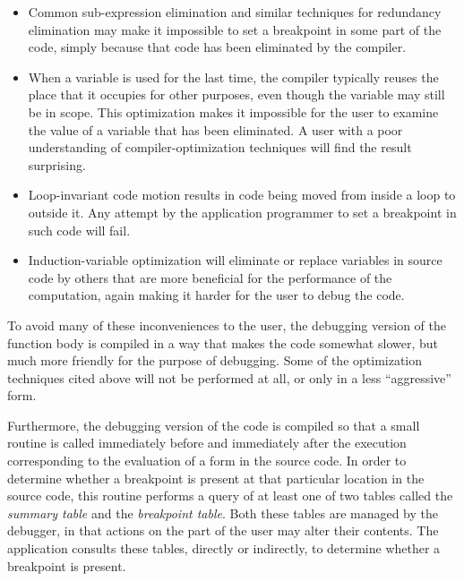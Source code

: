 \begin{itemize}
\item Common sub-expression elimination and similar techniques for
  redundancy elimination may make it impossible to set
  a breakpoint in some part of the code, simply because that code has
  been eliminated by the compiler.
\item When a variable is used for the last time, the compiler
  typically reuses the place that it occupies for other purposes, even
  though the variable may still be in scope.  This optimization makes
  it impossible for the user to examine the value of
  a variable that has been eliminated.  A user with
  a poor understanding of compiler-optimization techniques will find
  the result surprising.
\item Loop-invariant code motion results in code being moved from
  inside a loop to outside it.  Any attempt by the application
  programmer to set a breakpoint in such code will fail.
\item Induction-variable optimization will eliminate or replace
  variables in source code by others that are more beneficial for
  the performance of the computation, again making it harder for the
  user to debug the code.
\end{itemize}

To avoid many of these inconveniences to the user,
the debugging version of the function body is compiled in a way that
makes the code somewhat slower, but much more friendly for the purpose
of debugging.  Some of the optimization techniques cited above will
not be performed at all, or only in a less ``aggressive'' form.

Furthermore, the debugging version of the code is compiled so that a
small routine is called immediately before and immediately after the
execution corresponding to the evaluation of a form in the source
code.  In order to determine whether a breakpoint is present at that
particular location in the source code, this routine performs a query
of at least one of two tables called the \emph{summary table} and the
\emph{breakpoint table}.  Both these tables are managed by the
debugger, in that actions on the part of the user may alter their
contents.  The application consults these tables, directly or
indirectly, to determine whether a breakpoint is present.


